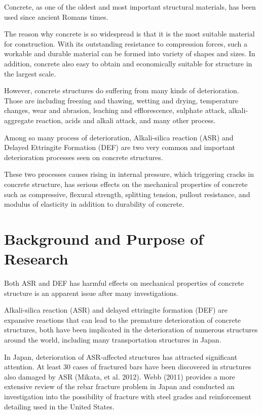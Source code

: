 

Concrete, as one of the oldest and most important structural materials, has been used since ancient Romans times.

The reason why concrete is so widespread is that it is the most suitable material for construction. With its outstanding resistance to compression forces, such a workable and durable material can be formed into variety of shapes and sizes. In addition, concrete also easy to obtain and economically suitable for structure in the largest scale.

However, concrete structures do suffering from many kinds of deterioration. Those are including freezing and thawing, wetting and drying, temperature changes, wear and abrasion, leaching and efflorescence, sulphate attack, alkali-aggregate reaction, acids and alkali attack, and many other process.

Among so many process of deterioration, Alkali-silica reaction (ASR) and Delayed Ettringite Formation (DEF) are two very common and important deterioration processes seen on concrete structures.

These two processes causes rising in internal pressure, which triggering cracks in concrete structure, has serious effects on the mechanical properties of concrete such as compressive, flexural strength, splitting tension, pullout resistance, and modulus of elasticity in addition to durability of concrete.

\section{Background and Purpose of Research}

Both ASR and DEF has harmful effects on mechanical properties of concrete structure is an apparent issue after many investigations.

Alkali-silica reaction (ASR) and delayed ettringite formation (DEF) are expansive reactions that can lead to the premature deterioration of concrete structures, both have been implicated in the deterioration of numerous structures around the world, including many transportation structures in Japan.


In Japan, deterioration of ASR-affected structures  has attracted significant attention. At least 30 cases of fractured bars have been discovered in structures also damaged by ASR (Mikata, et al. 2012)\cite{Mikata}. Webb (2011) \cite{Webb} provides a more extensive review of the rebar fracture problem in Japan and conducted an investigation into the possibility of fracture with steel grades and reinforcement detailing used in the United States.

